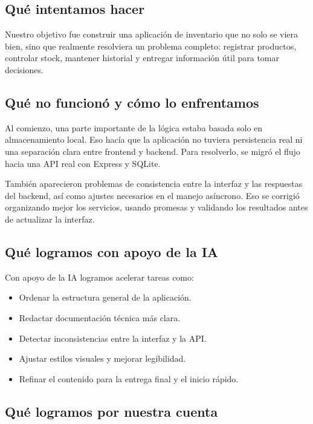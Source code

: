 \documentclass[12pt,a4paper]{article}
\begin{document}
\subsection{Qué intentamos hacer}

Nuestro objetivo fue construir una aplicación de inventario que no solo se viera bien, sino que realmente resolviera un problema completo: registrar productos, controlar stock, mantener historial y entregar información útil para tomar decisiones.

\subsection{Qué no funcionó y cómo lo enfrentamos}

Al comienzo, una parte importante de la lógica estaba basada solo en almacenamiento local. Eso hacía que la aplicación no tuviera persistencia real ni una separación clara entre frontend y backend. Para resolverlo, se migró el flujo hacia una API real con Express y SQLite.

También aparecieron problemas de consistencia entre la interfaz y las respuestas del backend, así como ajustes necesarios en el manejo asíncrono. Eso se corrigió organizando mejor los servicios, usando promesas y validando los resultados antes de actualizar la interfaz.

\subsection{Qué logramos con apoyo de la IA}

Con apoyo de la IA logramos acelerar tareas como:

\begin{itemize}[leftmargin=1.2cm]
    \item Ordenar la estructura general de la aplicación.
    \item Redactar documentación técnica más clara.
    \item Detectar inconsistencias entre la interfaz y la API.
    \item Ajustar estilos visuales y mejorar legibilidad.
    \item Refinar el contenido para la entrega final y el inicio rápido.
\end{itemize}

\subsection{Qué logramos por nuestra cuenta}
\end{document}
